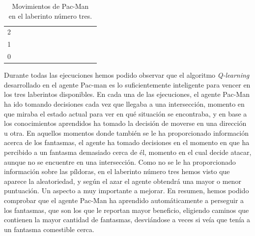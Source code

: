 \documentclass[11pt]{exam}
\begin{document}
\begin{table}[H]
\begin{tabular}{ccccccccccccc}
		\multicolumn{1}{c|}{2} &
		\multicolumn{1}{c|}{\cellcolor[HTML]{000000}} &
		\multicolumn{1}{c|}{} &
		\multicolumn{1}{c|}{} &
		\multicolumn{1}{c|}{} &
		\multicolumn{1}{c|}{} &
		\multicolumn{1}{c|}{} &
		\multicolumn{1}{c|}{} &
		\multicolumn{1}{c|}{} &
		\multicolumn{1}{c|}{} &
		\multicolumn{1}{c|}{} &
		\multicolumn{1}{c|}{} &
		\cellcolor[HTML]{000000} \\ \cline{2-12}
		\multicolumn{1}{c|}{1} &
		\multicolumn{1}{c|}{\cellcolor[HTML]{000000}} &
		\multicolumn{1}{c|}{} &
		\multicolumn{1}{c|}{} &
		\multicolumn{1}{c|}{} &
		\multicolumn{1}{c|}{} &
		\multicolumn{1}{c|}{} &
		\multicolumn{1}{c|}{} &
		\multicolumn{1}{c|}{} &
		\multicolumn{1}{c|}{} &
		\multicolumn{1}{c|}{} &
		\multicolumn{1}{c|}{} &
		\cellcolor[HTML]{000000} \\ \cline{2-12}
		\multicolumn{1}{c|}{0} &
		\multicolumn{1}{c|}{\cellcolor[HTML]{000000}} &
		\multicolumn{1}{c|}{\cellcolor[HTML]{000000}} &
		\multicolumn{1}{c|}{\cellcolor[HTML]{000000}} &
		\multicolumn{1}{c|}{\cellcolor[HTML]{000000}} &
		\multicolumn{1}{c|}{\cellcolor[HTML]{000000}} &
		\multicolumn{1}{c|}{\cellcolor[HTML]{000000}} &
		\multicolumn{1}{c|}{\cellcolor[HTML]{000000}} &
		\multicolumn{1}{c|}{\cellcolor[HTML]{000000}} &
		\cellcolor[HTML]{000000}{\color[HTML]{333333} } &
		\cellcolor[HTML]{000000}{\color[HTML]{333333} } &
		\cellcolor[HTML]{000000}{\color[HTML]{333333} } &
		\cellcolor[HTML]{000000}{\color[HTML]{333333} } \\ \cline{2-9}
	\end{tabular}
	\caption{Movimientos de Pac-Man \\ en el laberinto número tres.}
	\label{tabla_lab3}
\end{table}

Durante todas las ejecuciones hemos podido observar que el algoritmo \textit{Q-learning} desarrollado en el agente Pac-man es lo suficientemente inteligente para vencer en los tres laberintos disponibles. En cada una de las ejecuciones, el agente Pac-Man ha ido tomando decisiones cada vez que llegaba a una intersección, momento en que miraba el estado actual para ver en qué situación se encontraba, y en base a los conocimientos aprendidos ha tomado la decisión de moverse en una dirección u otra. En aquellos momentos donde también se le ha proporcionado información acerca de los fantasmas, el agente ha tomado decisiones en el momento en que ha percibido a un fantasma demasiado cerca de él, momento en el cual decide atacar, aunque no se encuentre en una intersección. Como no se le ha proporcionado información sobre las píldoras, en el laberinto número tres hemos visto que aparece la aleatoriedad, y según el azar el agente obtendrá una mayor o menor puntuación. Un aspecto a muy importante a mejorar. En resumen, hemos podido comprobar que el agente Pac-Man ha aprendido automáticamente a perseguir a los fantasmas, que son los que le reportan mayor beneficio, eligiendo caminos que contienen la mayor cantidad de fantasmas, desviándose a veces si veía que tenía a un fantasma comestible cerca.
\end{document}
